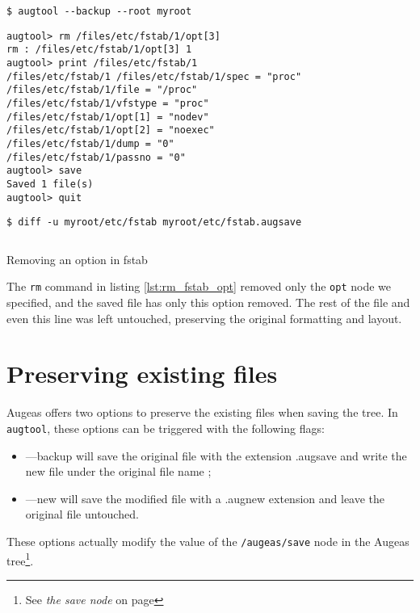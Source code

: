 \begin{listing}
  \begin{verbatim}
$ augtool --backup --root myroot
  \end{verbatim}
  \begin{verbatim}
augtool> rm /files/etc/fstab/1/opt[3]
rm : /files/etc/fstab/1/opt[3] 1
augtool> print /files/etc/fstab/1
/files/etc/fstab/1 /files/etc/fstab/1/spec = "proc"
/files/etc/fstab/1/file = "/proc"
/files/etc/fstab/1/vfstype = "proc"
/files/etc/fstab/1/opt[1] = "nodev"
/files/etc/fstab/1/opt[2] = "noexec"
/files/etc/fstab/1/dump = "0"
/files/etc/fstab/1/passno = "0"
augtool> save
Saved 1 file(s)
augtool> quit
  \end{verbatim}
  \begin{verbatim}
$ diff -u myroot/etc/fstab myroot/etc/fstab.augsave
  \end{verbatim}
  \inputminted[linenos,frame=leftline]{diff}{listings/fstab_opt.diff}
  \label{lst:rm_fstab_opt}
  \caption{Removing an option in fstab}
\end{listing}


The \verb!rm! command in listing \ref{lst:rm_fstab_opt} removed only the \verb!opt! node we specified, and the saved file has only this option removed. The rest of the file and even this line was left untouched, preserving the original formatting and layout.

\section{Preserving existing files}

  

Augeas offers two options to preserve the existing files when saving the tree. In \verb!augtool!, these options can be triggered with the following flags:

\begin{itemize}
\item
  ---backup will save the original file with the extension .augsave and write the new file under the original file name ;
\item
  ---new will save the modified file with a .augnew extension and leave the original file untouched.
\end{itemize}
These options actually modify the value of the \verb!/augeas/save! node in the Augeas tree\footnote{See \emph{the save node} on page \pageref{sec:save_node}}.

